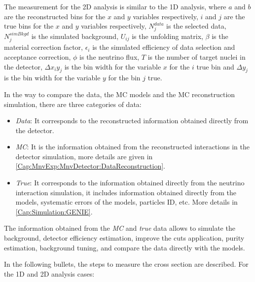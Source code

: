 The measurement for the 2D analysis is similar to the 1D analysis, where $a$ and $b$ are the reconstructed bins for the $x$ and $y$ variables respectively, $i$ and $j$ are the true bins for the $x$ and $y$ variables respectively, $N_j^{data}$ is the selected data, $N_j^{sim Bkgd}$ is the simulated background, $U_{ij}$ is the unfolding matrix, $\beta$ is the material correction factor, $\epsilon_i$ is the simulated efficiency of data selection and acceptance correction, $\phi$ is the neutrino flux, $T$ is the number of target nuclei in the detector, $\Delta x_i y_j$ is the bin width for the variable $x$ for the $i$ true bin and $\Delta y_j$ is the bin width for the variable $y$ for the bin $j$ true.

In the way to compare the data, the MC models and the MC reconstruction simulation, there are three categories of data:
\begin{itemize}
    \item \textit{Data}: It corresponds to the reconstructed information obtained directly from the detector.
    \item \textit{MC}: It is the information obtained from the reconstructed interactions in the detector simulation, more details are given in \ref{Cap:MnvExp:MnvDetector:DataReconstruction}. 
    \item \textit{True}: It corresponds to the information obtained directly from the neutrino interaction simulation, it includes information obtained directly from the models, systematic errors of the models, particles ID, etc. More details in \ref{Cap:Simulation:GENIE}.
\end{itemize}

The information obtained from the \textit{MC} and \textit{true} data allows to simulate the background, detector efficiency estimation, improve the cuts application, purity estimation, background tuning, and compare the data directly with the models. 

In the following bullets, the steps to measure the cross section are described. For the 1D and 2D analysis cases:

